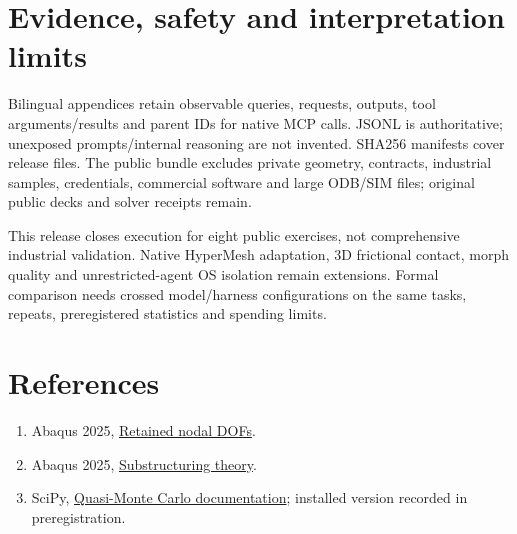 \documentclass[UTF8,a4paper,11pt,fontset=windows]{ctexart}
\begin{document}
\section{Evidence, safety and interpretation limits}

Bilingual appendices retain observable queries, requests, outputs, tool arguments/results and parent IDs for native MCP calls. JSONL is authoritative; unexposed prompts/internal reasoning are not invented. SHA256 manifests cover release files. The public bundle excludes private geometry, contracts, industrial samples, credentials, commercial software and large ODB/SIM files; original public decks and solver receipts remain.

This release closes execution for eight public exercises, not comprehensive industrial validation. Native HyperMesh adaptation, 3D frictional contact, morph quality and unrestricted-agent OS isolation remain extensions. Formal comparison needs crossed model/harness configurations on the same tasks, repeats, preregistered statistics and spending limits.

\section*{References}

\begin{enumerate}\item Abaqus 2025, \href{https://docs.software.vt.edu/abaqusv2025/English/SIMACAEKEYRefMap/simakey-r-retainednodaldofs.htm}{Retained nodal DOFs}.

\item Abaqus 2025, \href{https://docs.software.vt.edu/abaqusv2025/English/SIMACAETHERefMap/simathe-c-superelements.htm}{Substructuring theory}.

\item SciPy, \href{https://docs.scipy.org/doc/scipy/reference/stats.qmc.html}{Quasi-Monte Carlo documentation}; installed version recorded in preregistration.\end{enumerate}
\end{document}
